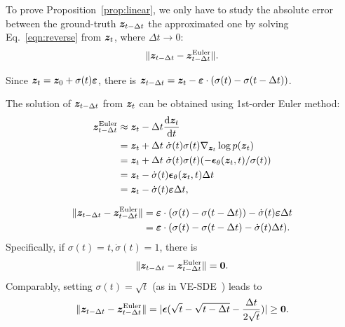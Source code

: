 To prove Proposition~\ref{prop:linear}, we only have to study the absolute error between the ground-truth ${\bm{z}}_{t-\Delta t}$ the approximated one by solving Eq.~\ref{eqn:reverse} from ${\bm{z}}_t$, where $\Delta t \rightarrow 0$:
\begin{equation}
    \Vert {{\bm{z}}}_{t-\Delta t}  - {\bm{z}}_{t - \Delta t}^{\text{Euler}} \Vert.
\end{equation}

Since ${\bm{z}}_t = {\bm{z}}_0 + \sigma(t) \bm{\varepsilon}$, there is ${\bm{z}}_{t-\Delta t} = {\bm{z}}_t - \bm{\varepsilon} \cdot  (\sigma (t) - \sigma(t-\Delta t) )$.

The solution of ${\bm{z}}_{t-\Delta t}$ from ${\bm{z}}_t$ can be obtained using 1st-order Euler method:
\begin{equation}
\begin{split}
    {\bm{z}}_{t - \Delta t}^{\text{Euler}}  & \approx {\bm{z}}_t - \Delta t \frac{{\rm d}{\bm{z}}_t }{ {\rm d} t} \\
    & = {\bm{z}}_t + \Delta t \; \dot{\sigma}(t)\sigma(t) \nabla_{{\bm{z}}_t} \log p({\bm{z}}_t)  \\
    & = {\bm{z}}_t + \Delta t \; \dot{\sigma}(t)\sigma(t) (-\bm{\epsilon}_{\theta}({\bm{z}}_t, t) / \sigma(t)) \\
    & = {\bm{z}}_t - \dot{\sigma}(t) \bm{\epsilon}_{\theta}({\bm{z}}_t, t) \Delta t \\
    & = {\bm{z}}_t - \dot{\sigma}(t) \bm{\varepsilon} \Delta t,
\end{split}
\end{equation}

\begin{equation}
\begin{split}
    \Vert {{\bm{z}}}_{t-\Delta t}  - {\bm{z}}_{t - \Delta t}^{\text{Euler}} \Vert & = \bm{\varepsilon} \cdot (\sigma (t) - \sigma(t-\Delta t) ) -  \dot{\sigma}(t) \bm{\varepsilon} \Delta t \\
    & =  \bm{\varepsilon} \cdot (\sigma (t) - \sigma(t-\Delta t) - \dot{\sigma}(t) \Delta t  ) .
\end{split}
\end{equation}
Specifically, if $\sigma(t) = t, \dot{\sigma}(t) = 1$, there is
\begin{equation}
    \Vert {{\bm{z}}}_{t-\Delta t}  - {\bm{z}}_{t - \Delta t}^{\text{Euler}} \Vert = \bm{0}.
\end{equation}
Comparably, setting $\sigma(t) = \sqrt{t}$ (as in VE-SDE~\cite{vp}) leads to
\begin{equation}
    \Vert {{\bm{z}}}_{t-\Delta t}  - {\bm{z}}_{t - \Delta t}^{\text{Euler}} \Vert = | \bm{\epsilon} (\sqrt{t} - \sqrt{t-\Delta t} - \frac{\Delta t}{2\sqrt{t}}) |  \ge \bm{0}.
\end{equation}

